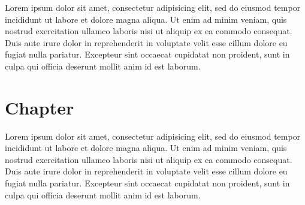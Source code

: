 \documentclass[a5paper, 10pt]{book}
\begin{document}
	Lorem ipsum dolor sit amet, consectetur adipisicing elit, sed do eiusmod tempor incididunt ut labore et dolore magna aliqua. Ut enim ad minim veniam, quis nostrud exercitation ullamco laboris nisi ut aliquip ex ea commodo consequat. Duis aute irure dolor in reprehenderit in voluptate velit esse cillum dolore eu fugiat nulla pariatur. Excepteur sint occaecat cupidatat non proident, sunt in culpa qui officia deserunt mollit anim id est laborum.



	\chapter{Chapter}

	Lorem ipsum dolor sit amet, consectetur adipisicing elit, sed do eiusmod tempor incididunt ut labore et dolore magna aliqua. Ut enim ad minim veniam, quis nostrud exercitation ullamco laboris nisi ut aliquip ex ea commodo consequat. Duis aute irure dolor in reprehenderit in voluptate velit esse cillum dolore eu fugiat nulla pariatur. Excepteur sint occaecat cupidatat non proident, sunt in culpa qui officia deserunt mollit anim id est laborum.






\end{document}
